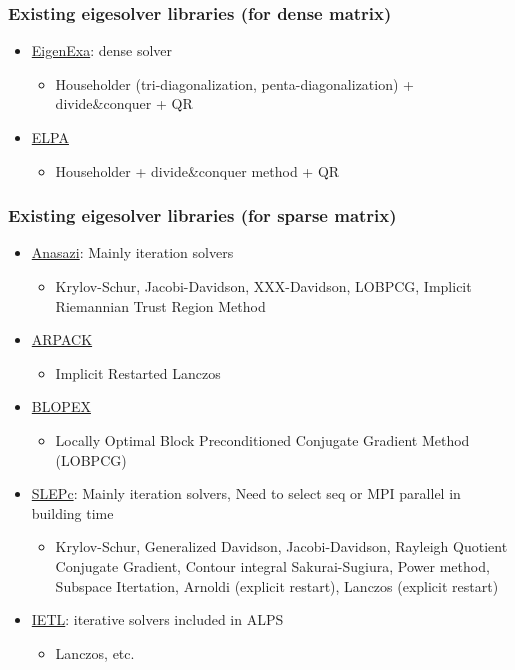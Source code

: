 \begin{frame}
  \frametitle{Existing eigesolver libraries (for dense matrix)}
  \begin{itemize}
  \item \href{http://www.aics.riken.jp/labs/lpnctrt/EigenExa.html}{EigenExa}: dense solver
    \begin{itemize}
      \item Householder (tri-diagonalization, penta-diagonalization) + divide\&conquer + QR
    \end{itemize}
  \item \href{http://elpa.rzg.mpg.de}{ELPA}
    \begin{itemize}
      \item Householder + divide\&conquer method + QR
    \end{itemize}
  \end{itemize}
\end{frame}

\begin{frame}
  \frametitle{Existing eigesolver libraries (for sparse matrix)}
  \begin{itemize}
  \item \href{http://trilinos.org/packages/anasazi/}{Anasazi}: Mainly iteration solvers
    \begin{itemize}
      \item Krylov-Schur, Jacobi-Davidson, XXX-Davidson, LOBPCG, Implicit Riemannian Trust Region Method
    \end{itemize}
  \item \href{http://www.caam.rice.edu/software/ARPACK/}{ARPACK}
    \begin{itemize}
      \item Implicit Restarted Lanczos
    \end{itemize}
  \item \href{https://code.google.com/p/blopex/}{BLOPEX}
    \begin{itemize}
    \item Locally Optimal Block Preconditioned Conjugate Gradient Method (LOBPCG)
    \end{itemize}
  \item \href{http://www.grycap.upv.es/slepc/}{SLEPc}: Mainly iteration solvers, Need to select seq or MPI parallel in building time
    \begin{itemize}
      \item Krylov-Schur, Generalized Davidson, Jacobi-Davidson, Rayleigh Quotient Conjugate Gradient, Contour integral Sakurai-Sugiura, Power method, Subspace Itertation, Arnoldi (explicit restart), Lanczos (explicit restart) \\
    \end{itemize}
  \item \href{http://www.comp-phys.org/software/ietl/}{IETL}: iterative solvers included in ALPS
    \begin{itemize}
      \item Lanczos, etc.
    \end{itemize}
  \end{itemize}
\end{frame}

